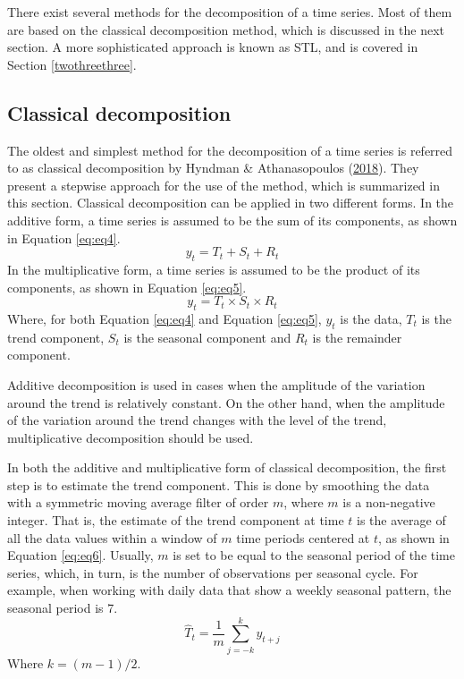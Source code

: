 \documentclass[12pt,oneside]{reedthesis}
\begin{document}
There exist several methods for the decomposition of a time series. Most
of them are based on the classical decomposition method, which is
discussed in the next section. A more sophisticated approach is known as
STL, and is covered in Section \ref{twothreethree}.

\subsection{Classical decomposition}\label{classical-decomposition}

The oldest and simplest method for the decomposition of a time series is
referred to as classical decomposition by Hyndman \& Athanasopoulos
(\protect\hyperlink{ref-hyndman2018fpp}{2018}). They present a stepwise
approach for the use of the method, which is summarized in this section.
Classical decomposition can be applied in two different forms. In the
additive form, a time series is assumed to be the sum of its components,
as shown in Equation \eqref{eq:eq4}.
\begin{equation}
y_{t} = T_{t} + S_{t} + R_{t}
\label{eq:eq4}
\end{equation}
In the multiplicative form, a time series is assumed to be the product
of its components, as shown in Equation \eqref{eq:eq5}.
\begin{equation}
y_{t} = T_{t} \times S_{t} \times R_{t}
\label{eq:eq5}
\end{equation}
Where, for both Equation \eqref{eq:eq4} and Equation \eqref{eq:eq5},
\(y_{t}\) is the data, \(T_{t}\) is the trend component, \(S_{t}\) is
the seasonal component and \(R_{t}\) is the remainder component.

Additive decomposition is used in cases when the amplitude of the
variation around the trend is relatively constant. On the other hand,
when the amplitude of the variation around the trend changes with the
level of the trend, multiplicative decomposition should be used.

In both the additive and multiplicative form of classical decomposition,
the first step is to estimate the trend component. This is done by
smoothing the data with a symmetric moving average filter of order
\(m\), where \(m\) is a non-negative integer. That is, the estimate of
the trend component at time \(t\) is the average of all the data values
within a window of \(m\) time periods centered at \(t\), as shown in
Equation \eqref{eq:eq6}. Usually, \(m\) is set to be equal to the seasonal
period of the time series, which, in turn, is the number of observations
per seasonal cycle. For example, when working with daily data that show
a weekly seasonal pattern, the seasonal period is 7.
\begin{equation}
\hat{T}_{t} = \frac{1}{m}\sum_{j=-k}^{k}y_{t+j}
\label{eq:eq6}
\end{equation}
Where \(k = (m-1)/2\).
\end{document}
